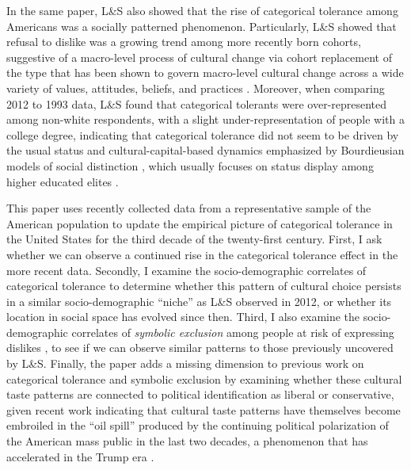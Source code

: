 \documentclass[12pt]{article}
\begin{document}
In the same paper, L\&S also showed that the rise of categorical tolerance among Americans was a socially patterned phenomenon. Particularly, L\&S showed that refusal to dislike was a growing trend among more recently born cohorts, suggestive of a macro-level process of cultural change via cohort replacement of the type that has been shown to govern macro-level cultural change across a wide variety of values, attitudes, beliefs, and practices \citep{vaisey2016cultural-867, kiley2020measuring-123, ochoa2024opinions-856, vaisey2021model-based-deb}. Moreover, when comparing 2012 to 1993 data, L\&S found that categorical tolerants were over-represented among non-white respondents, with a slight under-representation of people with a college degree, indicating that categorical tolerance did not seem to be driven by the usual status and cultural-capital-based dynamics emphasized by Bourdieusian models of social distinction \citep{bourdieu1984distinction-835}, which usually focuses on status display among higher educated elites \citep{jarness2017im-001, khan2011privilege-68a}.

This paper uses recently collected data from a representative sample of the American population to update the empirical picture of categorical tolerance in the United States for the third decade of the twenty-first century. First, I ask whether we can observe a continued rise in the categorical tolerance effect in the more recent data. Secondly, I examine the socio-demographic correlates of categorical tolerance to determine whether this pattern of cultural choice persists in a similar socio-demographic ``niche'' \citep{mcpherson2004blau-9fe} as L\&S observed in 2012, or whether its location in social space has evolved since then. Third, I also examine the socio-demographic correlates of \textit{symbolic exclusion} among people at risk of expressing dislikes \citep{bryson1996anything-311}, to see if we can observe similar patterns to those previously uncovered by L\&S. Finally, the paper adds a missing dimension to previous work on categorical tolerance and symbolic exclusion by examining whether these cultural taste patterns are connected to political identification as liberal or conservative, given recent work indicating that cultural taste patterns have themselves become embroiled in the ``oil spill'' \citep{dellaposta2020pluralistic-ed4} produced by the continuing political polarization of the American mass public in the last two decades, a phenomenon that has accelerated in the Trump era \citep{rawlings2023polarization-0af}.
\end{document}
